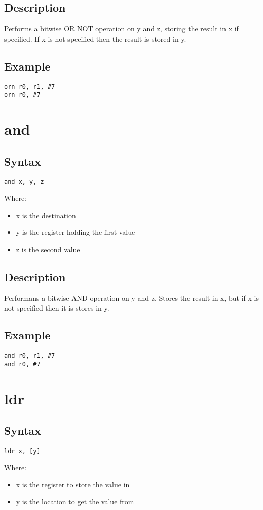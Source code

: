 \documentclass[11pt]{scrartcl}
\begin{document}
\subsection{Description}
Performs a bitwise OR NOT operation on y and z, storing the result
in x if specified. If x is not specified then the result is stored in y.
\subsection{Example}
\begin{verbatim}
orn r0, r1, #7
orn r0, #7
\end{verbatim}

\section{and}
\subsection{Syntax}
\begin{verbatim}
and x, y, z
\end{verbatim}
Where:
\begin{itemize}
    \item x is the destination
    \item y is the register holding the first value
    \item z is the second value
\end{itemize}
\subsection{Description}
Performans a bitwise AND operation on y and z. Stores the result in x,
but if x is not specified then it is stores in y.
\subsection{Example}
\begin{verbatim}
and r0, r1, #7
and r0, #7
\end{verbatim}

\section{ldr}
\subsection{Syntax}
\begin{verbatim}
ldr x, [y]
\end{verbatim}
Where:
\begin{itemize}
    \item x is the register to store the value in
    \item y is the location to get the value from
\end{itemize}
\end{document}
